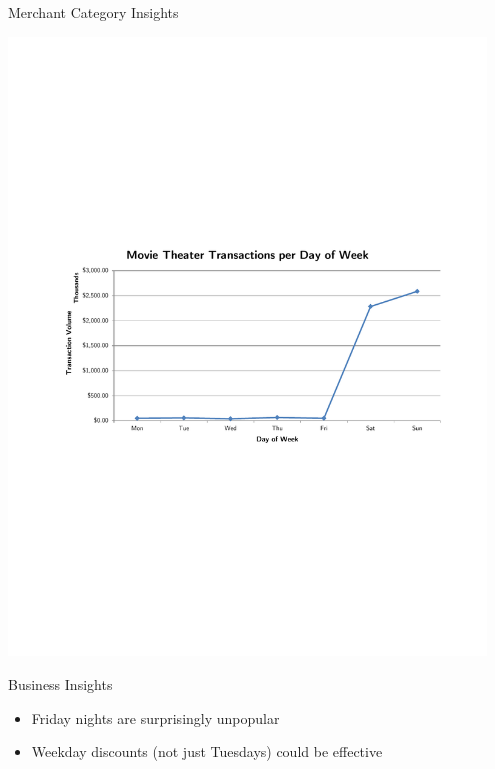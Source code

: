 \documentclass[xcolor=dvipsnames]{beamer}
\begin{document}
\begin{frame}[t]{Merchant Category Insights}
	\vspace{-2pt}
	\centerline{\includegraphics[width=0.95\textwidth]{movies-tx}}
	\vspace{-8pt}
	\begin{block}{Business Insights}
		\small
		\begin{itemize}
			\item Friday nights are surprisingly unpopular
			\vspace{-4pt}
			\item Weekday discounts (not just Tuesdays) could be effective
		\end{itemize}
	\end{block}
\end{frame}
\end{document}
